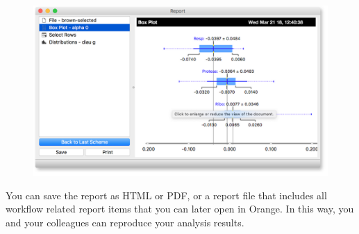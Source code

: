 \begin{figure}[h]
  \centering
  \includegraphics[width=\linewidth]{saving-fig2.png}%
  \label{fig:saveing-fig2}
\end{figure}

You can save the report as HTML or PDF, or a report file that includes all workflow related report items that you can later open in Orange. In this way, you and your colleagues can reproduce your analysis results.